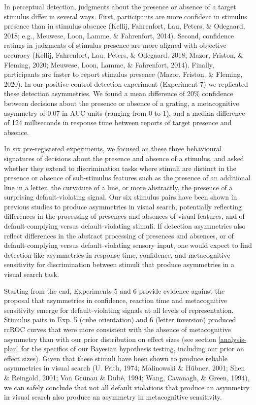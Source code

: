 \documentclass[12pt,twoside]{reedthesis}
\begin{document}
In perceptual detection, judgments about the presence or absence of a target stimulus differ in several ways. First, participants are more confident in stimulus presence than in stimulus absence (Kellij, Fahrenfort, Lau, Peters, \& Odegaard, 2018; e.g., Meuwese, Loon, Lamme, \& Fahrenfort, 2014). Second, confidence ratings in judgments of stimulus presence are more aligned with objective accuracy (Kellij, Fahrenfort, Lau, Peters, \& Odegaard, 2018; Mazor, Friston, \& Fleming, 2020; Meuwese, Loon, Lamme, \& Fahrenfort, 2014). Finally, participants are faster to report stimulus presence (Mazor, Friston, \& Fleming, 2020). In our positive control detection experiment (Experiment 7) we replicated these detection asymmetries. We found a mean difference of 20\% confidence between decisions about the presence or absence of a grating, a metacognitive asymmetry of 0.07 in AUC units (ranging from 0 to 1), and a median difference of 124 milliseconds in response time between reports of target presence and absence.

In six pre-registered experiments, we focused on these three behavioural signatures of decisions about the presence and absence of a stimulus, and asked whether they extend to discrimination tasks where stimuli are distinct in the presence or absence of sub-stimulus features such as the presence of an additional line in a letter, the curvature of a line, or more abstractly, the presence of a surprising default-violating signal. Our six stimulus pairs have been shown in previous studies to produce asymmetries in visual search, potentially reflecting differences in the processing of presences and absences of visual features, and of default-complying versus default-violating stimuli. If detection asymmetries also reflect differences in the abstract processing of presences and absences, or of default-complying versus default-violating sensory input, one would expect to find detection-like asymmetries in response time, confidence, and metacognitive sensitivity for discrimination between stimuli that produce asymmetries in a visual search task.

Starting from the end, Experiments 5 and 6 provide evidence against the proposal that asymmetries in confidence, reaction time and metacognitive sensitivity emerge for default-violating signals at all levels of representation. Stimulus pairs in Exp. 5 (cube orientation) and 6 (letter inversion) produced rcROC curves that were more consistent with the absence of metacognitive asymmetry than with our prior distribution on effect sizes (see section \ref{analysis-plan} for the specifics of our Bayesian hypothesis testing, including our prior on effect sizes). Given that these stimuli have been shown to produce reliable asymmetries in visual search (U. Frith, 1974; Malinowski \& Hübner, 2001; Shen \& Reingold, 2001; Von Grünau \& Dubé, 1994; Wang, Cavanagh, \& Green, 1994), we can safely conclude that not all default violations that produce an asymmetry in visual search also produce an asymmetry in metacognitive sensitivity.
\end{document}
